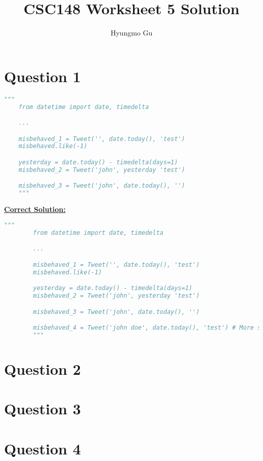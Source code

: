 \documentclass[12pt]{article}
\begin{document}
\title{CSC148 Worksheet 5 Solution}
\author{Hyungmo Gu}
\maketitle

\section*{Question 1}

\begin{lstlisting}[language=Python]
    """
    from datetime import date, timedelta

    ...

    misbehaved_1 = Tweet('', date.today(), 'test')
    misbehaved.like(-1)

    yesterday = date.today() - timedelta(days=1)
    misbehaved_2 = Tweet('john', yesterday 'test')

    misbehaved_3 = Tweet('john', date.today(), '')
    """
\end{lstlisting}

\bigskip

\begin{mdframed}
    \underline{\textbf{Correct Solution:}}

    \bigskip

    \begin{lstlisting}[language=Python]
        """
        from datetime import date, timedelta

        ...

        misbehaved_1 = Tweet('', date.today(), 'test')
        misbehaved.like(-1)

        yesterday = date.today() - timedelta(days=1)
        misbehaved_2 = Tweet('john', yesterday 'test')

        misbehaved_3 = Tweet('john', date.today(), '')

        misbehaved_4 = Tweet('john doe', date.today(), 'test') # More solution!!
        """
    \end{lstlisting}

\end{mdframed}


\section*{Question 2}



\section*{Question 3}

\section*{Question 4}
\end{document}
